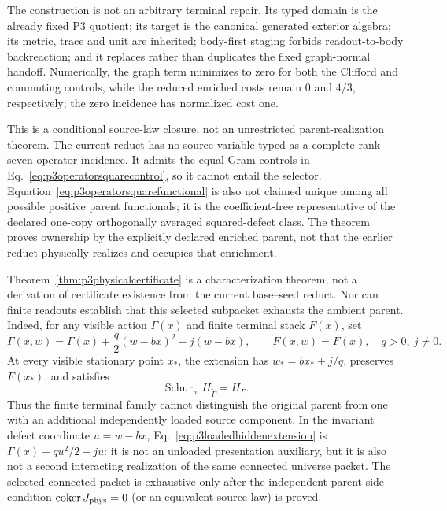 The construction is not an arbitrary terminal repair.  Its typed domain is
the already fixed P3 quotient; its target is the canonical generated exterior
algebra; its metric, trace and unit are inherited; body-first staging forbids
readout-to-body backreaction; and it replaces rather than duplicates the
fixed graph-normal handoff.  Numerically, the graph term minimizes to zero
for both the Clifford and commuting controls, while the reduced enriched
costs remain $0$ and $4/3$, respectively; the zero incidence has normalized
cost one.

This is a conditional source-law closure, not an unrestricted
parent-realization theorem.
The current reduct has no source variable typed as a complete rank-seven
operator incidence.  It admits the equal-Gram controls in
Eq.~\eqref{eq:p3operatorsquarecontrol}, so it cannot entail the selector.
Equation~\eqref{eq:p3operatorsquarefunctional} is also not claimed unique
among all possible positive parent functionals; it is the coefficient-free
representative of the declared one-copy orthogonally averaged squared-defect
class.  The theorem proves ownership by the explicitly declared enriched
parent, not that the earlier reduct physically realizes and occupies that
enrichment.

Theorem~\ref{thm:p3physicalcertificate} is a characterization theorem, not a
derivation of certificate existence from the current base--seed reduct.  Nor
can finite readouts establish that this selected subpacket exhausts the
ambient parent.  Indeed, for any visible action $\Gamma(x)$ and finite
terminal stack $F(x)$, set
\begin{equation}
 \widetilde\Gamma(x,w)=\Gamma(x)
 +\frac{q}{2}(w-bx)^2-j(w-bx),\qquad
 \widetilde F(x,w)=F(x),
 \quad q>0,\ j\ne0.
 \label{eq:p3loadedhiddenextension}
\end{equation}
At every visible stationary point $x_*$, the extension has
$w_*=bx_*+j/q$, preserves $F(x_*)$, and satisfies
\begin{equation}
 \operatorname{Schur}_w H_{\widetilde\Gamma}=H_\Gamma.
 \label{eq:p3loadedhiddenschur}
\end{equation}
Thus the finite terminal family cannot distinguish the original parent from
one with an additional independently loaded source component.  In the
invariant defect coordinate $u=w-bx$, Eq.~\eqref{eq:p3loadedhiddenextension}
is $\Gamma(x)+qu^2/2-ju$: it is not an unloaded presentation auxiliary, but
it is also not a second interacting realization of the same connected
universe packet.  The selected connected packet is exhaustive only after the
independent parent-side condition
$\operatorname{coker}J_{\rm phys}=0$ (or an equivalent source law) is proved.

